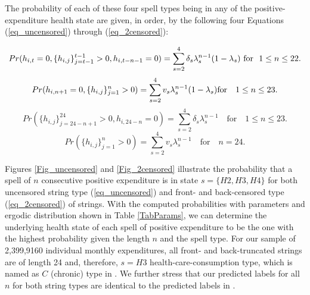 \documentclass[letterpaper,12pt]{article}
\theoremstyle{definition}
\begin{document}
\begin{spacing}{1.5}{}
  The probability of each of these four spell types being in any of the positive-expenditure health state are given, in order, by the following four Equations (\ref{eq_uncensored}) through (\ref{eq_2censored}):
  
  \begin{equation} \label{eq_uncensored}
    Pr(h_{i,t} = 0, \{h_{i,j}\}_{j=t-1}^{t-1} > 0, h_{i,t-n-1} = 0) = \sum_{s=2}^4 \delta_s\lambda_s^{n-1} (1 - \lambda_s)  \\
    \text{\space for \space} 1 \leq n \leq 22.
  \end{equation}
    \begin{equation} \label{eq_fcensored}
    Pr(h_{i,n+1} = 0, \{h_{i,j}\}_{j=1}^{n} > 0) = \sum_{s=2}^4 v_s\lambda_s^{n-1} (1 - \lambda_s) \quad \\
    \text{for} \quad 1 \leq n \leq 23.
  \end{equation}
    \begin{equation} \label{eq_bcensored}
    Pr(\{h_{i,j}\}_{j=24-n+1}^{24} > 0, h_{i,24-n} = 0) = \sum_{s=2}^4 \delta_s\lambda_s^{n-1} \quad \text{for} \quad 1 \leq n \leq 23.
  \end{equation}
    \begin{equation} \label{eq_2censored}
    Pr(\{h_{i,j}\}_{j=1}^{n} > 0) = \sum_{s=2}^4 v_s\lambda_s^{n-1} \quad \text{for} \quad n = 24.
  \end{equation}
  
  Figures \ref{Fig_uncensored} and \ref{Fig_2censored} illustrate the probability that a spell of $n$ consecutive positive expenditure is in state $s = \{H2, H3, H4\}$ for both uncensored string type (\ref{eq_uncensored}) and front- and back-censored type (\ref{eq_2censored}) of strings. With the computed probabilities with parameters and ergodic distribution shown in Table \ref{TabParams}, we can determine the underlying health state of each spell of positive expenditure to be the one with the highest probability given the length $n$ and the spell type. For our sample of 2,399,9160 individual monthly expenditures, all front- and back-truncated strings are of length 24 and, therefore, $s = H3$ health-care-consumption type, which is named as $C$ (chronic) type in \citet{evans}. We further stress that our predicted labels for all $n$ for both string types are identical to the predicted labels in \citet{evans}. 


\end{spacing}
\end{document}
